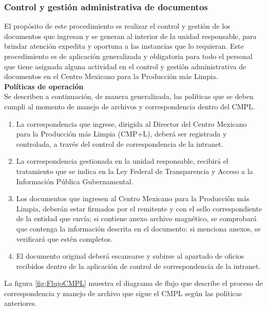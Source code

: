 		\subsubsection{Control y gestión administrativa de documentos}
	
	El propósito de este procedimiento es realizar el control y gestión de los documentos que ingresan y se generan al interior de la unidad responsable, para brindar atención expedita y oportuna a las instancias que lo requieran. Este procedimiento es de aplicación generalizada y obligatoria para todo el personal que tiene asignada alguna actividad en el control y gestión administrativa de documentos en el Centro Mexicano para la Producción más Limpia\cite{ControlCMPL}.\\
	
		\textbf{Políticas de operación}\\
		
	Se describen a continuación, de manera generalizada, las políticas que se deben cumpli al momento de manejo de archivos y correspondencia dentro del CMPL.
		
		\begin{enumerate}
			\item La correspondencia que ingrese, dirigida al Director del Centro Mexicano para la Producción más Limpia (CMP+L), deberá ser registrada y controlada, a través del control de correspondencia de la intranet\cite{ControlCMPL}.
			\item La correspondencia gestionada en la unidad responsable, recibirá el tratamiento que se indica en la Ley Federal de Transparencia y Acceso a la Información Pública Gubernamental\cite{ControlCMPL}.
			\item Los documentos que ingresen al Centro Mexicano para la Producción más Limpia, deberán estar firmados por el remitente y con el sello correspondiente de la entidad que envía; si contiene anexo archivo magnético, se comprobará que contenga la información descrita en el documento; si menciona anexos, se verificará que estén completos\cite{ControlCMPL}.
			\item El documento original deberá escanearse y subirse al apartado de oficios recibidos dentro de la aplicación de control de correspondencia de la intranet\cite{ControlCMPL}.
		\end{enumerate}
		
	La figura \ref{fig:FlujoCMPL} muestra el diagrama de flujo que describe el proceso de correspondencia y manejo de archivo que sigue el CMPL según las políticas anteriores.		
		
